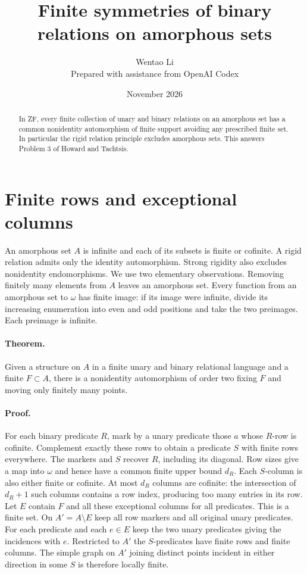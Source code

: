 \documentclass[11pt]{article}
\title{Finite symmetries of binary relations on amorphous sets}
\author{Wentao Li\\[2pt]\small Prepared with assistance from OpenAI Codex}
\date{November 2026}
\begin{document}
\maketitle
\begin{abstract}
In ZF, every finite collection of unary and binary relations on an amorphous set has a common nonidentity automorphism of finite support avoiding any prescribed finite set. In particular the rigid relation principle excludes amorphous sets. This answers Problem 3 of Howard and Tachtsis.
\end{abstract}
\section{Finite rows and exceptional columns}
An amorphous set $A$ is infinite and each of its subsets is finite or cofinite. A rigid relation admits only the identity automorphism. Strong rigidity also excludes nonidentity endomorphisms. We use two elementary observations. Removing finitely many elements from $A$ leaves an amorphous set. Every function from an amorphous set to $\omega$ has finite image: if its image were infinite, divide its increasing enumeration into even and odd positions and take the two preimages. Each preimage is infinite.
\paragraph{Theorem.} Given a structure on $A$ in a finite unary and binary relational language and a finite $F\subset A$, there is a nonidentity automorphism of order two fixing $F$ and moving only finitely many points.
\paragraph{Proof.} For each binary predicate $R$, mark by a unary predicate those $a$ whose $R$-row is cofinite. Complement exactly these rows to obtain a predicate $S$ with finite rows everywhere. The markers and $S$ recover $R$, including its diagonal. Row sizes give a map into $\omega$ and hence have a common finite upper bound $d_R$. Each $S$-column is also either finite or cofinite. At most $d_R$ columns are cofinite: the intersection of $d_R+1$ such columns contains a row index, producing too many entries in its row.
Let $E$ contain $F$ and all these exceptional columns for all predicates. This is a finite set. On $A'=A\setminus E$ keep all row markers and all original unary predicates. For each predicate and each $e\in E$ keep the two unary predicates giving the incidences with $e$. Restricted to $A'$ the $S$-predicates have finite rows and finite columns. The simple graph on $A'$ joining distinct points incident in either direction in some $S$ is therefore locally finite.
\end{document}
